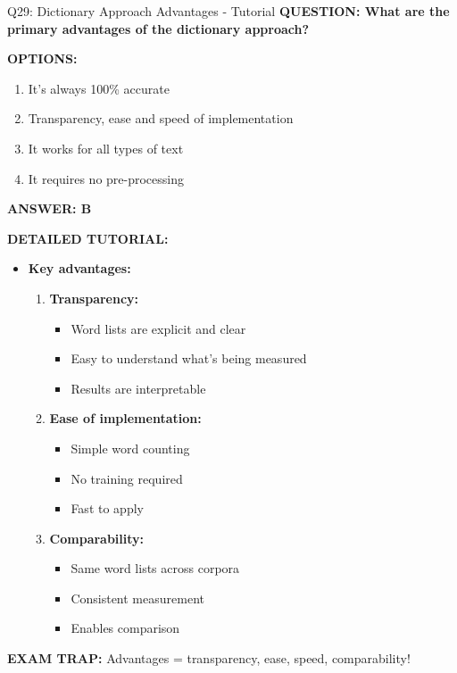 \documentclass[8pt]{beamer}
\begin{document}
	\begin{frame}{Q29: Dictionary Approach Advantages - Tutorial}
		\fontsize{6.5}{7.5}\selectfont
		\textbf{QUESTION: What are the primary advantages of the dictionary approach?}
		
		\vspace{0.1cm}
		\textbf{OPTIONS:}
		\begin{enumerate}
			\item It's always 100\% accurate
			\item Transparency, ease and speed of implementation
			\item It works for all types of text
			\item It requires no pre-processing
		\end{enumerate}
		
		\vspace{0.1cm}
		\textcolor{myblue}{\textbf{ANSWER: B}}
		
		\vspace{0.1cm}
		\textbf{DETAILED TUTORIAL:}
		\begin{itemize}
			\item \textbf{Key advantages:}
			\begin{enumerate}
				\item \textbf{Transparency:}
				\begin{itemize}
					\item Word lists are explicit and clear
					\item Easy to understand what's being measured
					\item Results are interpretable
				\end{itemize}
				\item \textbf{Ease of implementation:}
				\begin{itemize}
					\item Simple word counting
					\item No training required
					\item Fast to apply
				\end{itemize}
				\item \textbf{Comparability:}
				\begin{itemize}
					\item Same word lists across corpora
					\item Consistent measurement
					\item Enables comparison
				\end{itemize}
			\end{enumerate}
		\end{itemize}
		
		\textcolor{myred}{\textbf{EXAM TRAP:}} Advantages = \textcolor{myblue}{transparency, ease, speed, comparability}!
	\end{frame}
	
\end{document}
